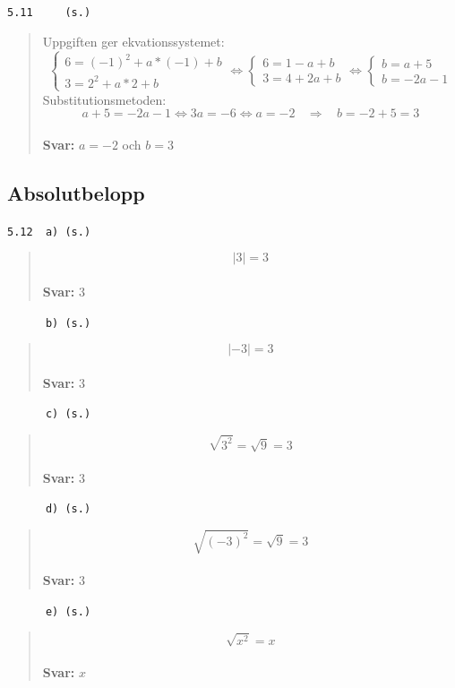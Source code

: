\documentclass[a4paper]{article}
\newcommand{\tskcol}[1]{\textcolor{tskcol}{#1}}
\begin{document}
	\pagebreak
	\texttt{\tskcol{5.11~~~~ (s.)}}
	\begin{quotation}
		\noindent
		Uppgiften ger ekvationssystemet:
		\[\begin{cases} 
		6=(-1)^2+a*(-1)+b \\ 
		3=2^2+a*2+b
		\end{cases} \Leftrightarrow
		\begin{cases} 
		6=1-a+b \\ 
		3=4+2a+b
		\end{cases} \Leftrightarrow
		\begin{cases} 
		b=a+5 \\ 
		b=-2a-1
		\end{cases}\]
		Substitutionsmetoden:
		\[a+5=-2a-1 \Leftrightarrow
		3a=-6 \Leftrightarrow
		a=-2 ~~~~\Rightarrow
		~~~~b=-2+5=3\]
		\\
		\textbf{Svar:} $a=-2$ och $b=3$
	\end{quotation}
	
	\subsection*{Absolutbelopp}
	
	\texttt{\tskcol{5.12~~a) (s.)}}
	\begin{quotation}
		\noindent
		\[|3|=3\]
		\\
		\textbf{Svar:} $3$
	\end{quotation}
	
	\texttt{\tskcol{~~~~~~b) (s.)}}
	\begin{quotation}
		\noindent
		\[|-3|=3\]
		\\
		\textbf{Svar:} $3$
	\end{quotation}
	
	\texttt{\tskcol{~~~~~~c) (s.)}}
	\begin{quotation}
		\noindent
		\[\sqrt{3^2}=\sqrt{9}=3\]
		\\
		\textbf{Svar:} $3$
	\end{quotation}
	
	\texttt{\tskcol{~~~~~~d) (s.)}}
	\begin{quotation}
		\noindent
		\[\sqrt{(-3)^2}=\sqrt{9}=3\]
		\\
		\textbf{Svar:} $3$
	\end{quotation}
	
	\texttt{\tskcol{~~~~~~e) (s.)}}
	\begin{quotation}
		\noindent
		\[\sqrt{x^2}=x\]
		\\
		\textbf{Svar:} $x$
	\end{quotation}
	
\end{document}
